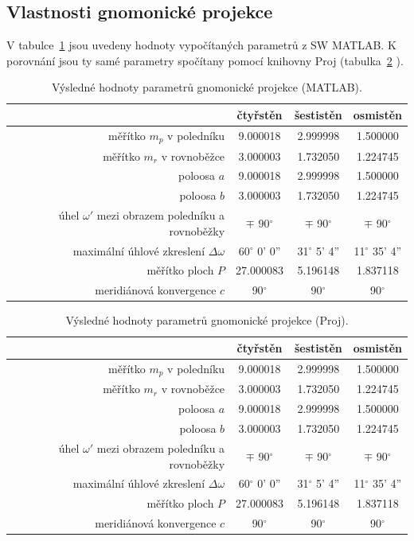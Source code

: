 \subsection{Vlastnosti gnomonické projekce}
V tabulce~\ref{table:1} jsou uvedeny hodnoty vypočítaných parametrů z SW MATLAB. 
K porovnání jsou ty samé parametry spočítany pomocí knihovny Proj (tabulka~\ref{table:2} ).

\begin{table}[htbp]
\centering
\renewcommand{\arraystretch}{1.2} 
\begin{tabular}{|r||c|c|c|}
\hline
 & čtyřstěn & šestistěn & osmistěn \\
\hline
měřítko $m_p$ v poledníku & 9.000018 & 2.999998 & 1.500000 \\
\hline
měřítko $m_r$ v rovnoběžce & 3.000003 & 1.732050 & 1.224745 \\
\hline
poloosa $a$ & 9.000018 & 2.999998 & 1.500000 \\
\hline
poloosa $b$ & 3.000003 & 1.732050 & 1.224745 \\
\hline
úhel $\omega'$ mezi obrazem poledníku a rovnoběžky & $\mp$ 90$^\circ$ & $\mp$ 90$^\circ$ & $\mp$ 90$^\circ$ \\
\hline
maximální úhlové zkreslení $\Delta\omega$ & 60$^\circ$ 0' 0'' & 31$^\circ$ 5' 4'' & 11$^\circ$ 35' 4'' \\
\hline
měřítko ploch $P$ & 27.000083 & 5.196148 & 1.837118 \\
\hline
meridiánová konvergence $c$ & 90$^\circ$ & 90$^\circ$ & 90$^\circ$ \\
\hline

\end{tabular}
\caption{Výsledné hodnoty parametrů gnomonické projekce (MATLAB).}
\label{table:1}
\end{table}


\begin{table}[htbp]
\centering
\renewcommand{\arraystretch}{1.2} 
\begin{tabular}{|r||c|c|c|}
\hline
 & čtyřstěn & šestistěn & osmistěn \\
\hline
měřítko $m_p$ v poledníku & 9.000018 & 2.999998 & 1.500000 \\
\hline
měřítko $m_r$ v rovnoběžce & 3.000003 & 1.732050 & 1.224745 \\
\hline
poloosa $a$ & 9.000018 & 2.999998 & 1.500000 \\
\hline
poloosa $b$ & 3.000003 & 1.732050 & 1.224745 \\
\hline
úhel $\omega'$ mezi obrazem poledníku a rovnoběžky & $\mp$ 90$^\circ$ & $\mp$ 90$^\circ$ & $\mp$ 90$^\circ$ \\
\hline
maximální úhlové zkreslení $\Delta\omega$ & 60$^\circ$ 0' 0'' & 31$^\circ$ 5' 4'' & 11$^\circ$ 35' 4'' \\
\hline
měřítko ploch $P$ & 27.000083 & 5.196148 & 1.837118 \\
\hline
meridiánová konvergence $c$ & 90$^\circ$ & 90$^\circ$ & 90$^\circ$ \\
\hline
\end{tabular}
\caption{Výsledné hodnoty parametrů gnomonické projekce (Proj).}
\label{table:2}
\end{table}

